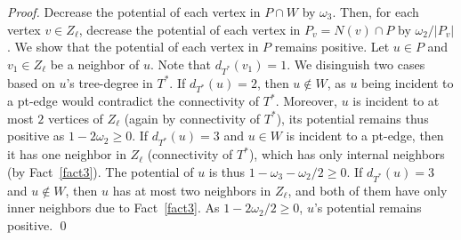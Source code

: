 \documentclass{llncs}
\begin{document}
{\begin{proof}
 Decrease the potential of each vertex in $P \cap W$ by $\omega_3$. Then, for each vertex $v \in Z_\ell$, decrease the potential of each vertex in
$P_v=N(v)\cap P$ 
by $\omega_2/|P_v|$. We show that the potential of each vertex in $P$ remains positive.
 Let $u \in P$ and $v_1 \in Z_\ell$ be a neighbor of $u$. Note that $d_{T^*}(v_1)=1$. We disinguish two cases based on $u$'s tree-degree 
in $T^*$. If $d_{T^*}(u)=2$, then $u \not \in W$, as $u$ being incident to a pt-edge would contradict the connectivity of $T^*$. Moreover, $u$ is
incident to at most $2$ vertices of $Z_\ell$ (again by connectivity of $T^*$), its potential remains thus positive as $1-2 \omega_2 \ge 0$. If
$d_{T^*}(u)=3$ and $u \in W$ is incident to a pt-edge, then it has one neighbor in $Z_\ell$ (connectivity of $T^*$), which has only internal neighbors
(by Fact~\ref{fact3}). The potential of $u$ is thus $1-\omega_3-\omega_2/2 \ge 0$. If $d_{T^*}(u)=3$ and $u \not \in W$, then $u$ has at most two
neighbors in $Z_\ell$, and both of them have only inner neighbors due to Fact~\ref{fact3}. As $1-2 \omega_2 / 2 \ge 0$, $u$'s potential remains positive.
\qed
\end{proof}
}
\end{document}
